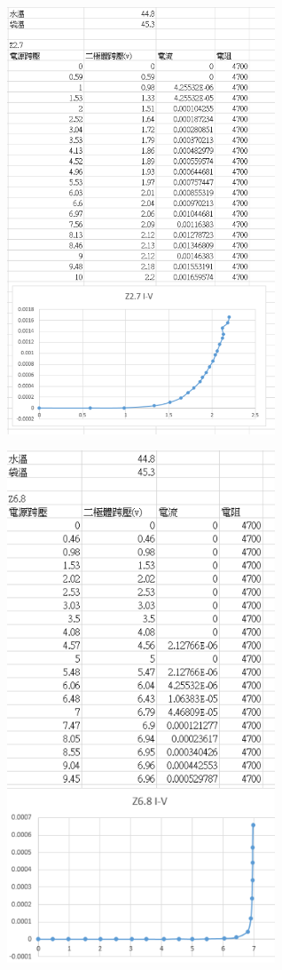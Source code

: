 \documentclass[UTF8]{ctexart}
\begin{document}
\begin{CJK*}{UTF8}{song}
\begin{minipage}[t]{0.48\textwidth}
\centering
\includegraphics[width = 0.6\textwidth]{45z27.png}
\end{minipage}
\begin{minipage}[t]{0.48\textwidth}
\centering
\includegraphics[width = 0.6\textwidth]{45z68.png}
\end{minipage}
\newpage


\end{CJK*}
\end{document}
